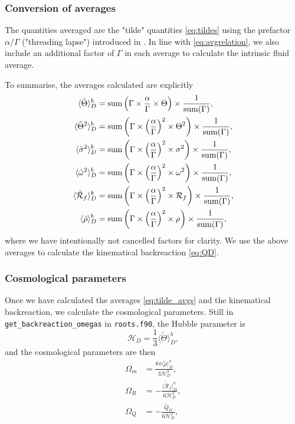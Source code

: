 \documentclass[a4paper]{article}
\newcommand{\alp}{\alpha}
\newcommand{\Gam}{\Gamma}
\begin{document}
\subsubsection{Conversion of averages}

The quantities averaged are the "tilde" quantities \eqref{eq:tildes} using the prefactor $\alp/\Gam$ ("threading lapse") introduced in \citet{Buchert2020}. In line with \eqref{eq:avgrelation}, we also include an additional factor of $\Gam$ in each average to calculate the intrinsic fluid average. 

To summarise, the averages calculated are explicitly
\begin{align}\label{eq:tilde_avgs}
	\langle\tilde{\Theta}\rangle_D^b &= {\rm sum}\left(\Gam \times \frac{\alp}{\Gam} \times \Theta \right) \times \frac{1}{{\rm sum}(\Gam)}, \\
	\langle\tilde{\Theta}^2\rangle_D^b &= {\rm sum}\left(\Gam \times \left(\frac{\alp}{\Gam}\right)^2 \times \Theta^2 \right) \times \frac{1}{{\rm sum}(\Gam)}, \\
	\langle\tilde{\sigma}^2\rangle_D^b &= {\rm sum}\left(\Gam \times \left(\frac{\alp}{\Gam}\right)^2 \times \sigma^2 \right) \times \frac{1}{{\rm sum}(\Gam)}, \\ 
	\langle\tilde{\omega}^2\rangle_D^b &= {\rm sum}\left(\Gam \times \left(\frac{\alp}{\Gam}\right)^2 \times \omega^2 \right) \times \frac{1}{{\rm sum}(\Gam)}, \\
	\langle\tilde{\mathcal{R}}_f\rangle_D^b &= {\rm sum}\left(\Gam \times \left(\frac{\alp}{\Gam}\right)^2 \times \mathcal{R}_f \right) \times \frac{1}{{\rm sum}(\Gam)}, \\
	\langle\tilde{\rho}\rangle_D^b &= {\rm sum}\left(\Gam \times \left(\frac{\alp}{\Gam}\right)^2 \times \rho \right) \times \frac{1}{{\rm sum}(\Gam)}, \\
\end{align}
where we have intentionally not cancelled factors for clarity. We use the above averages to calculate the kinematical backreaction \eqref{eq:QD}.


\subsubsection{Cosmological parameters}

Once we have calculated the averages \eqref{eq:tilde_avgs} and the kinematical backreaction, we calculate the cosmological parameters. Still in \texttt{get\_backreaction\_omegas} in \texttt{roots.f90}, the Hubble parameter is
\begin{equation}
	\mathcal{H}_D = \frac{1}{3} \langle\tilde{\Theta}\rangle_D^b, 
\end{equation}
and the cosmological parameters are then
\begin{align}
	\Omega_m &= \frac{8 \pi \langle\tilde{\rho}\rangle_D^b}{3 \mathcal{H}_D^2}, \\
	\Omega_R &= - \frac{\langle\tilde{\mathcal{R}}_f\rangle_D^b}{6 \mathcal{H}_D^2}, \\
	\Omega_Q &= - \frac{\tilde{Q}_D}{6 \mathcal{H}_D^2},
\end{align}
\end{document}

